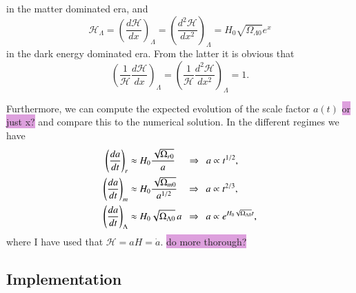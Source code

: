 \documentclass{aa}
\begin{document}
in the matter dominated era, and
\begin{equation}
  \mathcal{H}_\Lambda = \left(\frac{d\mathcal{H}}{dx}\right)_\Lambda = \left(\frac{d^2\mathcal{H}}{dx^2}\right)_\Lambda = H_0\sqrt{\Omega_{\Lambda0}}e^{x}
\end{equation}
in the dark energy dominated era. From the latter it is obvious that
\begin{equation}
  \left(\frac{1}{\mathcal{H}}\frac{d\mathcal{H}}{dx}\right)_\Lambda = \left(\frac{1}{\mathcal{H}}\frac{d^2\mathcal{H}}{dx^2}\right)_\Lambda = 1.
\end{equation} 

Furthermore, we can compute the expected evolution of the scale factor $a(t)$ \colorbox{Plum}{or just x?} and compare this to the numerical solution. In the different regimes we have
\begin{align}
  \left(\frac{da}{dt}\right)_r &\approx H_0\frac{\sqrt{\Omega_{r0}}}{a}
  \hspace{12pt}\Rightarrow\hspace{5pt} a \propto t^{1/2},
  \\
  \left(\frac{da}{dt}\right)_m &\approx H_0\frac{\sqrt{\Omega_{m0}}}{a^{1/2}}
  \hspace{9.5pt}\Rightarrow\hspace{5pt} a \propto t^{2/3},
  \\
  \left(\frac{da}{dt}\right)_\Lambda &\approx H_0\sqrt{\Omega_{\Lambda0}}\,a
  \hspace{5pt}\Rightarrow\hspace{5pt} a \propto e^{H_0\sqrt{\Omega_{\Lambda0}}t},
\end{align}
where I have used that $\mathcal{H}=aH = \dot{a}$. \colorbox{Plum}{do more thorough?}



\subsection{Implementation}\label{subsec: I methods}
\end{document}
